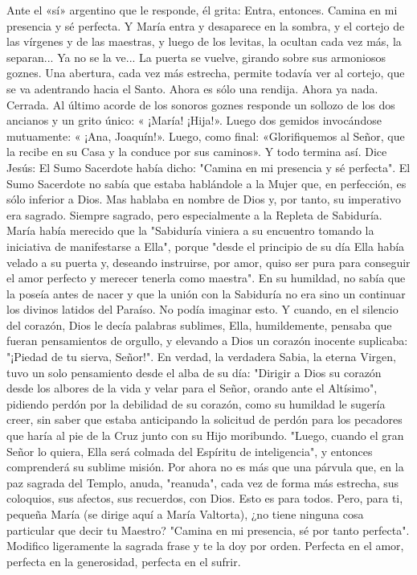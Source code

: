 \documentclass[12pt]{book} %
\begin{document}
Ante el «sí» argentino que le responde, él grita: 
Entra, entonces. Camina en mi presencia y sé perfecta. 
Y María entra y desaparece en la sombra, y el cortejo de las vírgenes y de las maestras, y luego de los levitas, la ocultan 
cada vez más, la separan... Ya no se la ve... 
La puerta se vuelve, girando sobre sus armoniosos goznes. Una abertura, cada vez más estrecha, permite todavía ver al 
cortejo, que se va adentrando hacia el Santo. Ahora es sólo una rendija. Ahora ya nada. Cerrada. 
Al último acorde de los sonoros goznes responde un sollozo de los dos ancianos y un grito único: « ¡María! ¡Hija!». Luego dos gemidos invocándose mutuamente: « ¡Ana, Joaquín!». Luego, como final: «Glorifiquemos al Señor, que la recibe en su Casa y la conduce por sus caminos». 
Y todo termina así. 
Dice Jesús: 
El Sumo Sacerdote había dicho: "Camina en mi presencia y sé perfecta". El Sumo Sacerdote no sabía que estaba 
hablándole a la Mujer que, en perfección, es sólo inferior a Dios. Mas hablaba en nombre de Dios y, por tanto, su imperativo era sagrado. Siempre sagrado, pero especialmente a la Repleta de Sabiduría. 
María había merecido que la "Sabiduría viniera a su encuentro tomando la iniciativa de manifestarse a Ella", porque "desde el principio de su día Ella había velado a su puerta y, deseando instruirse, por amor, quiso ser pura para conseguir el amor perfecto y merecer tenerla como maestra". 
En su humildad, no sabía que la poseía antes de nacer y que la unión con la Sabiduría no era sino un continuar los 
divinos latidos del Paraíso. No podía imaginar esto. Y cuando, en el silencio del corazón, Dios le decía palabras sublimes, Ella, humildemente, pensaba que fueran pensamientos de orgullo, y elevando a Dios un corazón inocente suplicaba: "¡Piedad de tu sierva, Señor!". 
En verdad, la verdadera Sabia, la eterna Virgen, tuvo un solo pensamiento desde el alba de su día: "Dirigir a Dios su corazón desde los albores de la vida y velar para el Señor, orando ante el Altísimo", pidiendo perdón por la debilidad de su corazón, como su humildad le sugería creer, sin saber que estaba anticipando la solicitud de perdón para los pecadores que haría al pie de la Cruz junto con su Hijo moribundo. 
"Luego, cuando el gran Señor lo quiera, Ella será colmada del Espíritu de inteligencia", y entonces comprenderá su sublime misión. Por ahora no es más que una párvula que, en la paz sagrada del Templo, anuda, "reanuda", cada vez de forma más estrecha, sus coloquios, sus afectos, sus recuerdos, con Dios. Esto es para todos. 
Pero, para ti, pequeña María (se dirige aquí a María Valtorta), ¿no tiene ninguna cosa particular que decir tu Maestro? "Camina en mi presencia, sé por tanto perfecta". Modifico ligeramente la sagrada frase y te la doy por orden. Perfecta en el amor, perfecta en la generosidad, perfecta en el sufrir. 
\end{document}

